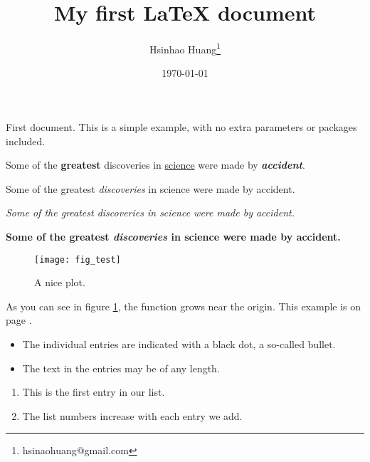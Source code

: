 \documentclass[12pt, a4paper]{article} %
\title{My first LaTeX document}                            %
\author{Hsinhao Huang\thanks{hsinaohuang@gmail.com}}       %
\date{\today}                                              %
\begin{document}

    \maketitle

    First document. This is a simple example, with no
    extra parameters or packages included.

    Some of the \textbf{greatest}                          %
    discoveries in \underline{science}                     %
    were made by \textbf{\textit{accident}}.               %

    Some of the greatest \emph{discoveries} in science
    were made by accident.

    \textit{Some of the greatest \emph{discoveries}        %
    in science were made by accident.}

    \textbf{Some of the greatest \emph{discoveries}
    in science were made by accident.}

    \begin{figure}[h]
        \centering
        \texttt{[image: fig\_test]}   %
        \caption
        {
            A nice plot.
        }
        \label{fig:test}
    \end{figure}

    As you can see in figure \ref{fig:test},
    the function grows near the origin.
    This example is on page \pageref{fig:test}.

    \begin{itemize}                                        %
        \item The individual entries are indicated with
              a black dot, a so-called bullet.
        \item The text in the entries may be of any length.
    \end{itemize}

    \begin{enumerate}                                      %
        \item This is the first entry in our list.
        \item The list numbers increase with each entry we add.
    \end{enumerate}
\end{document}
